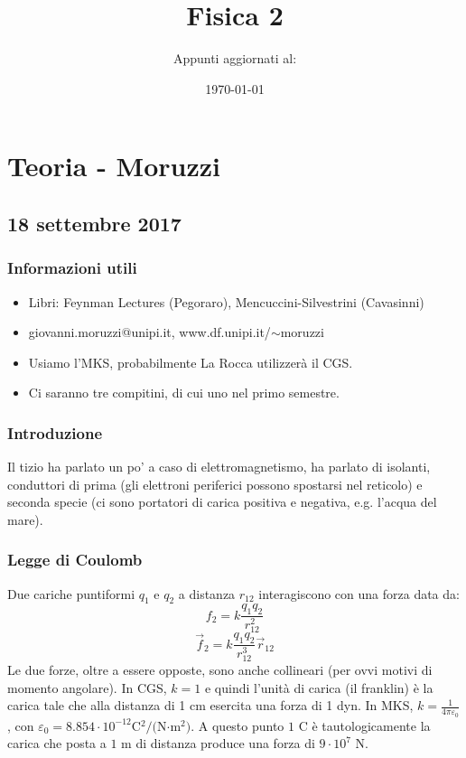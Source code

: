 \documentclass[a4paper,11pt]{book}
\title{Fisica 2}
\author{Appunti aggiornati al:}
\date{\today}
\let\oldepsilon\epsilon
\let\oldvarepsilon\varepsilon
\renewcommand{\epsilon}{\oldvarepsilon}
\renewcommand{\varepsilon}{\oldepsilon}
\theoremstyle{definition}
\theoremstyle{theorem}
\begin{document}
	\maketitle
	\tableofcontents
	\newpage
\chapter{Teoria - Moruzzi}
\section{18 settembre 2017}
	\subsection{Informazioni utili}
	\begin{itemize}
		\item Libri: Feynman Lectures (Pegoraro), Mencuccini-Silvestrini (Cavasinni)
		\item giovanni.moruzzi@unipi.it, www.df.unipi.it/$\sim$moruzzi
		\item Usiamo l'MKS, probabilmente La Rocca utilizzerà il CGS.
		\item Ci saranno tre compitini, di cui uno nel primo semestre.
	\end{itemize}
	\subsection{Introduzione}
	Il tizio ha parlato un po' a caso di elettromagnetismo, ha parlato di isolanti, conduttori di prima (gli elettroni periferici possono spostarsi nel reticolo) e seconda specie (ci sono portatori di carica positiva e negativa, e.g. l'acqua del mare).
	\subsection{Legge di Coulomb}
		Due cariche puntiformi $q_1$ e $q_2$ a distanza $r_{12}$ interagiscono con una forza data da:
		\[f_2=k\frac{q_1q_2}{r_{12}^2}\]
		\[\vec{f}_2=k\frac{q_1q_2}{r_{12}^3}\vec{r}_{12}\]
		Le due forze, oltre a essere opposte, sono anche collineari (per ovvi motivi di momento angolare).
		In CGS, $k=1$ e quindi l'unità di carica (il franklin) è la carica tale che alla distanza di 1 cm esercita una forza di 1 dyn. In MKS, $k=\frac{1}{4\pi\epsilon_0}$, con $\epsilon_0=8.854\cdot10^{-12} $C$^2/($N$\cdot $m$^2)$. A questo punto $1$ C è tautologicamente la carica che posta a $1$ m di distanza produce una forza di $9\cdot10^{7}$ N.
		
\end{document}
